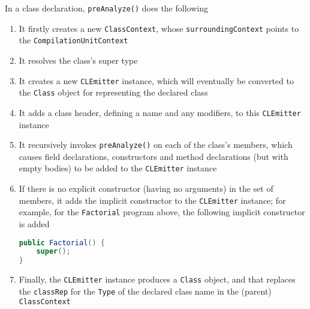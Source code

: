 \documentclass[8pt,a4paper,compress]{beamer}
\begin{document}
\begin{frame}[fragile]
\pause

In a class declaration, \lstinline{preAnalyze()} does the following
\begin{enumerate}
\pause
\item It firstly creates a new \lstinline{ClassContext}, whose \lstinline{surroundingContext} points to the \lstinline{CompilationUnitContext}
\pause
\item It resolves the class's super type
\pause
\item It creates a new \lstinline{CLEmitter} instance, which will eventually be converted to the \lstinline{Class} object for representing the declared class
\pause
\item It adds a class header, defining a name and any modifiers, to this \lstinline{CLEmitter} instance
\pause
\item It recursively invokes \lstinline{preAnalyze()} on each of the class's members, which causes field declarations, constructors and method declarations (but with empty bodies) to be added to the \lstinline{CLEmitter} instance
\pause
\item If there is no explicit constructor (having no arguments) in the set of members, it adds the implicit constructor to the \lstinline{CLEmitter} instance; for example, for the \lstinline{Factorial} program above, the following implicit constructor is added
\begin{lstlisting}[language=Java,style=focusin]
public Factorial() {
    super();
}
\end{lstlisting}
\pause
\item Finally, the \lstinline{CLEmitter} instance produces a \lstinline{Class} object, and that replaces the \lstinline{classRep} for the \lstinline{Type} of the declared class name in the (parent) \lstinline{ClassContext}
\end{enumerate}
\end{frame}
\end{document}
